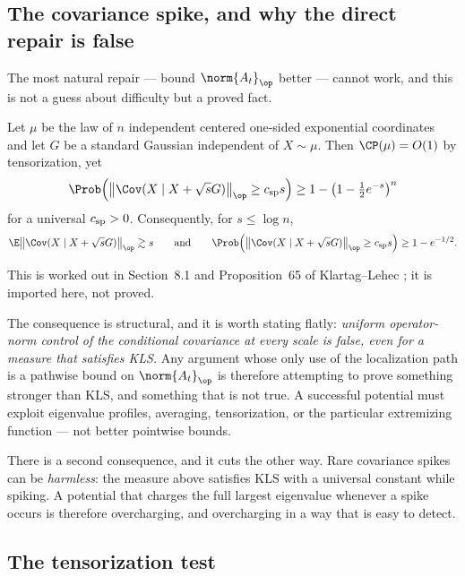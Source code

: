\documentclass[../../main.tex]{subfiles}
\begin{document}
\subsection{The covariance spike, and why the direct repair is false}
\label{subsec:kls-spike-obstruction}

The most natural repair --- bound $\norm{A_t}_\op$ better --- cannot work, and this is not a
guess about difficulty but a proved fact.

\begin{proposition}
\label{prop:covariance-spike}
Let $\mu$ be the law of $n$ independent centered one-sided exponential coordinates and let $G$ be a
standard Gaussian independent of $X\sim\mu$. Then $\CP(\mu)=O(1)$ by tensorization, yet
\[
  \Prob\!\left(
    \bigl\lVert\Cov(X\mid X+\sqrt sG)\bigr\rVert_\op\ge c_{\rm sp}s
  \right)
  \ge1-\left(1-\tfrac12e^{-s}\right)^n
\]
for a universal $c_{\rm sp}>0$. Consequently, for $s\le\log n$,
\[
  \E\bigl\lVert\Cov(X\mid X+\sqrt sG)\bigr\rVert_\op\gtrsim s
  \qquad\text{and}\qquad
  \Prob\!\left(
    \bigl\lVert\Cov(X\mid X+\sqrt sG)\bigr\rVert_\op\ge c_{\rm sp}s
  \right)\ge1-e^{-1/2}.
\]
\end{proposition}

This is worked out in Section~8.1 and Proposition~65 of Klartag--Lehec \cite{KLnotes}; it is
imported here, not proved.

The consequence is structural, and it is worth stating flatly: \emph{uniform operator-norm control
of the conditional covariance at every scale is false, even for a measure that satisfies KLS.}
Any argument whose only use of the localization path is a pathwise bound on
$\norm{A_t}_\op$ is therefore attempting to prove something stronger than KLS, and something that
is not true. A successful potential must exploit eigenvalue profiles, averaging, tensorization, or
the particular extremizing function --- not better pointwise bounds.

There is a second consequence, and it cuts the other way. Rare covariance spikes can be
\emph{harmless}: the measure above satisfies KLS with a universal constant while spiking. A
potential that charges the full largest eigenvalue whenever a spike occurs is therefore
overcharging, and overcharging in a way that is easy to detect.

\subsection{The tensorization test}
\label{subsec:kls-tensorization-test}
\end{document}
